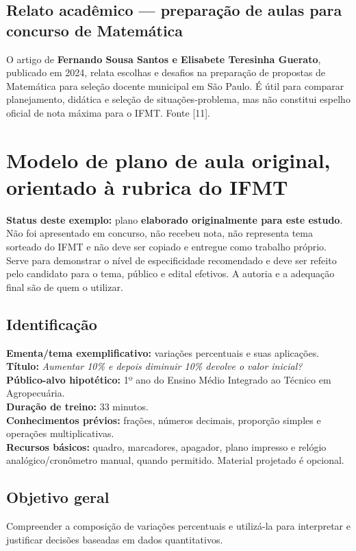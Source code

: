 \documentclass[11pt,a4paper]{article}
\begin{document}
\subsection{Relato acadêmico --- preparação de aulas para concurso de Matemática}
O artigo de \textbf{Fernando Sousa Santos e Elisabete Teresinha Guerato}, publicado em 2024, relata escolhas e desafios na preparação de propostas de Matemática para seleção docente municipal em São Paulo. É útil para comparar planejamento, didática e seleção de situações-problema, mas não constitui espelho oficial de nota máxima para o IFMT. Fonte [11].

\section{Modelo de plano de aula original, orientado à rubrica do IFMT}
\begin{alerta}
\textbf{Status deste exemplo:} plano \textbf{elaborado originalmente para este estudo}. Não foi apresentado em concurso, não recebeu nota, não representa tema sorteado do IFMT e não deve ser copiado e entregue como trabalho próprio. Serve para demonstrar o nível de especificidade recomendado e deve ser refeito pelo candidato para o tema, público e edital efetivos. A autoria e a adequação final são de quem o utilizar.
\end{alerta}

\subsection*{Identificação}
\textbf{Ementa/tema exemplificativo:} variações percentuais e suas aplicações.\\
\textbf{Título:} \textit{Aumentar 10\% e depois diminuir 10\% devolve o valor inicial?}\\
\textbf{Público-alvo hipotético:} 1º ano do Ensino Médio Integrado ao Técnico em Agropecuária.\\
\textbf{Duração de treino:} 33 minutos.\\
\textbf{Conhecimentos prévios:} frações, números decimais, proporção simples e operações multiplicativas.\\
\textbf{Recursos básicos:} quadro, marcadores, apagador, plano impresso e relógio analógico/cronômetro manual, quando permitido. Material projetado é opcional.

\subsection*{Objetivo geral}
Compreender a composição de variações percentuais e utilizá-la para interpretar e justificar decisões baseadas em dados quantitativos.
\end{document}
